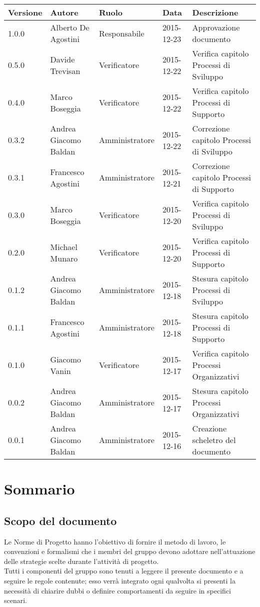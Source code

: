 \documentclass{scalatekids-article}
\begin{document}
\begin{center}
  \begin{tabular}{| l | l | l | l | l |}
    \hline
    Versione & Autore & Ruolo & Data & Descrizione \\
    \hline
    1.0.0 & Alberto De Agostini & Responsabile & 2015-12-23 & Approvazione documento\\
    \hline
    0.5.0 & Davide Trevisan & Verificatore & 2015-12-22 & Verifica capitolo Processi di Sviluppo\\
    \hline
    0.4.0 & Marco Boseggia & Verificatore & 2015-12-22 & Verifica capitolo Processi di Supporto\\
    \hline
    0.3.2 & Andrea Giacomo Baldan & Amministratore & 2015-12-22 & Correzione capitolo Processi di Sviluppo\\
    \hline
    0.3.1 & Francesco Agostini & Amministratore & 2015-12-21 & Correzione capitolo Processi di Supporto\\
    \hline
    0.3.0 & Marco Boseggia & Verificatore & 2015-12-20 & Verifica capitolo Processi di Sviluppo\\
    \hline
    0.2.0 & Michael Munaro & Verificatore & 2015-12-20 & Verifica capitolo Processi di Supporto\\
    \hline
    0.1.2 & Andrea Giacomo Baldan & Amministratore & 2015-12-18 & Stesura capitolo Processi di Sviluppo\\
    \hline
    0.1.1 & Francesco Agostini & Amministratore & 2015-12-18 & Stesura capitolo Processi di Supporto\\
    \hline
    0.1.0 & Giacomo Vanin & Verificatore & 2015-12-17 & Verifica capitolo Processi Organizzativi\\
    \hline
    0.0.2 & Andrea Giacomo Baldan & Amministratore & 2015-12-17 & Stesura capitolo Processi Organizzativi\\
    \hline
    0.0.1 & Andrea Giacomo Baldan & Amministratore & 2015-12-16 & Creazione scheletro del documento\\
    \hline
  \end{tabular}
\end{center}
\tableofcontents
\newpage
{}
\section{Sommario}
\subsection{Scopo del documento}
Le Norme di Progetto hanno l'obiettivo di fornire il metodo di lavoro, le
convenzioni e formalismi che i membri del gruppo devono adottare nell'attuazione
delle strategie scelte durante l'attività di progetto. \\
Tutti i componenti del gruppo sono tenuti a leggere il presente documento e a seguire
le regole contenute; esso verrà integrato ogni qualvolta si presenti la necessità di
chiarire dubbi o definire comportamenti da seguire in specifici scenari.
\prodPurpose \glossExpl
\end{document}
